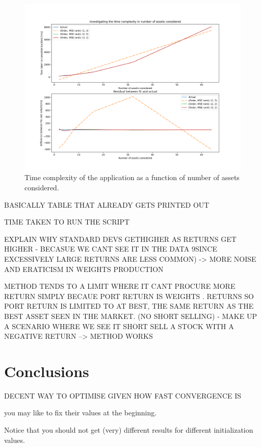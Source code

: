 \documentclass{article}
\begin{document}
\begin{figure}[H]
	\centerline{\includegraphics[width=\textwidth]{figures/time_complexity_in_assets.png}}
	\label{time_complexity_in_assets}
	\caption{Time complexity of the application as a function of number of assets considered.}
\end{figure}



BASICALLY TABLE THAT ALREADY GETS PRINTED OUT

TIME TAKEN TO RUN THE SCRIPT

EXPLAIN WHY STANDARD DEVS GETHIGHER AS RETURNS GET HIGHER - BECASUE WE CANT SEE IT IN THE DATA 9SINCE EXCESSIVELY LARGE RETURNS ARE LESS COMMON) -> MORE NOISE AND ERATICISM IN WEIGHTS PRODUCTION 

METHOD TENDS TO A LIMIT WHERE IT CANT PROCURE MORE RETURN SIMPLY BECAUE PORT RETURN IS WEIGHTS . RETURNS SO PORT RETURN IS LIMITED TO AT BEST, THE SAME RETURN AS THE BEST ASSET SEEN IN THE MARKET. (NO SHORT SELLING) - MAKE UP A SCENARIO WHERE WE SEE IT SHORT SELL A STOCK WITH A NEGATIVE RETURN --> METHOD WORKS


\section{Conclusions}
\label{sec:concs}


DECENT WAY TO OPTIMISE GIVEN HOW FAST CONVERGENCE IS


you may like to fix their values at the beginning.

Notice that you should not get (very) different results for different initialization values.
\end{document}
